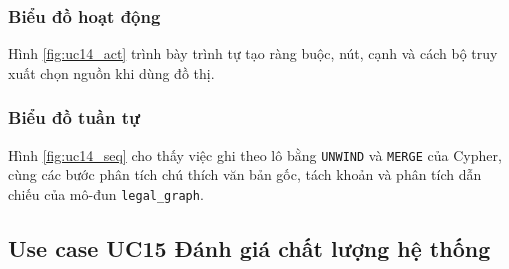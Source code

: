 \documentclass[../DoAn.tex]{subfiles}
\begin{document}

\subsubsection{Biểu đồ hoạt động}
Hình \ref{fig:uc14_act} trình bày trình tự tạo ràng buộc, nút, cạnh và cách bộ truy xuất chọn nguồn khi dùng đồ thị.


\subsubsection{Biểu đồ tuần tự}
Hình \ref{fig:uc14_seq} cho thấy việc ghi theo lô bằng \texttt{UNWIND} và \texttt{MERGE} của Cypher, cùng các bước phân tích chú thích văn bản gốc, tách khoản và phân tích dẫn chiếu của mô-đun \texttt{legal\_graph}.



\subsection{Use case UC15 Đánh giá chất lượng hệ thống}
\label{subsection:uc15}
\end{document}
